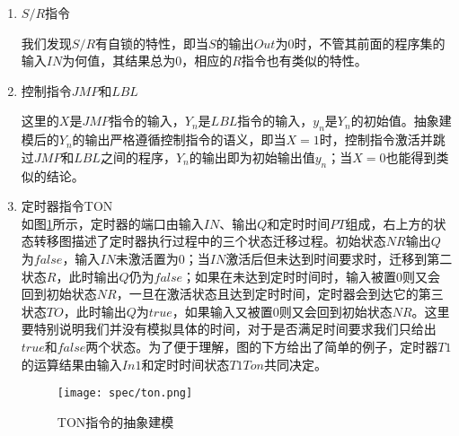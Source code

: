 \begin{enumerate}
	\item $S/R$指令\\
	\begin{center}
	\end{center}
	我们发现$S/R$有自锁的特性，即当$S$的输出$Out$为0时，不管其前面的程序集的输入$IN$为何值，其结果总为0，相应的$R$指令也有类似的特性。

	\item 控制指令$JMP$和$LBL$\\
	\begin{center}
	\end{center}
	这里的$X$是$JMP$指令的输入，$Y_n$是$LBL$指令的输入，$y_n$是$Y_n$的初始值。抽象建模后的$Y_n$的输出严格遵循控制指令的语义，即当$X=1$时，控制指令激活并跳过$JMP$和$LBL$之间的程序，$Y_n$的输出即为初始输出值$y_n$；当$X=0$也能得到类似的结论。
	\item 定时器指令TON\\
	如图\ref{fig22}所示，定时器的端口由输入$IN$、输出$Q$和定时时间$PT$组成，右上方的状态转移图描述了定时器执行过程中的三个状态迁移过程。初始状态$NR$输出$Q$为$false$，输入$IN$未激活置为0；当$IN$激活后但未达到时间要求时，迁移到第二状态$R$，此时输出$Q$仍为$false$；如果在未达到定时时间时，输入被置0则又会回到初始状态$NR$，一旦在激活状态且达到定时时间，定时器会到达它的第三状态$TO$，此时输出$Q$为$true$，如果输入又被置0则又会回到初始状态$NR$。这里要特别说明我们并没有模拟具体的时间，对于是否满足时间要求我们只给出$true$和$false$两个状态。为了便于理解，图的下方给出了简单的例子，定时器$T1$的运算结果由输入$In1$和定时时间状态$T1Ton$共同决定。
	\begin{figure}[!htb]
	\centering
	\texttt{[image: spec/ton.png]}
	\caption{TON指令的抽象建模}
	\label{fig22}
	\end{figure}



\end{enumerate}
